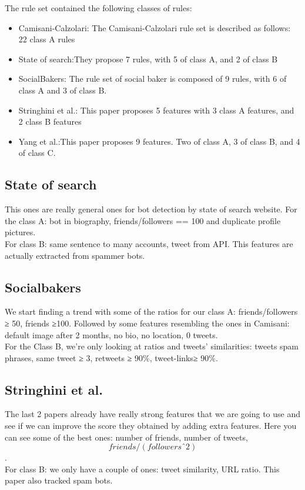 \documentclass[a4paper,11pt]{article}
\begin{document}
The rule set contained the following classes of rules:

\begin{itemize}
\item Camisani-Calzolari: The Camisani-Calzolari rule set is described as follows: 22 class A rules
\item State of search:They propose 7 rules, with 5 of class A, and 2 of class B
\item SocialBakers: The rule set of social baker is composed of 9 rules, with 6 of class A and 3 of class B.
\item Stringhini et al.: This paper proposes 5 features with 3 class A features, and 2 class B features
\item Yang et al.:This paper proposes 9 features. Two of class A, 3 of class B, and 4 of class C.
\end{itemize}

\subsection{State of search}
This ones are really general ones for bot detection by state of search website.
For the class A: bot in biography, friends/followers == 100 and duplicate profile pictures.\\
For class B: same sentence to many accounts, tweet from API.
This features are actually extracted from spammer bots.

\subsection{Socialbakers}
We start finding a trend with some of the ratios for our class A: friends/followers ≥ 50, friends ≥100. Followed by some features resembling the ones in Camisani: default image after 2 months, no bio, no location, 0 tweets.\\
For the Class B, we're only looking at ratios and tweets' similarities: tweets spam phrases, same tweet
≥ 3, retweets ≥ 90\%, tweet-links≥ 90\%.
\subsection{Stringhini et al.}
The last 2 papers already have really strong features that we are going to use and see if we can improve the score they obtained by adding extra features.
Here you can see some of the best ones: number of friends, number of tweets, $$friends/(followersˆ2)$$.\\
For class B: we only have a couple of ones: tweet similarity, URL ratio.
This paper also tracked spam bots.
\end{document}
